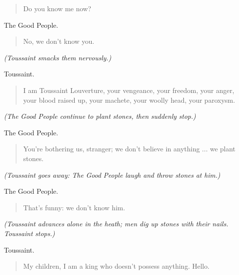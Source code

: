 \documentclass[letterpaper,article,12pt,oneside,notitlepage]{memoir}
\begin{document}
\begin{verse}
Do you know me now? \\
\end{verse}

\begin{center}The Good People.\end{center}

\begin{verse}
No, we don't know you. \\
\end{verse}

\textit{(Toussaint smacks them nervously.)}

\begin{center}Toussaint.\end{center}

\begin{verse}
I am Toussaint Louverture, your vengeance, your freedom, your anger, your blood raised up, your machete, your woolly head, your paroxysm. \\
\end{verse}

\textit{(The Good People continue to plant stones, then suddenly stop.)}

\begin{center}The Good People.\end{center}

\begin{verse}
You're bothering us, stranger; we don't believe in anything ... we plant stones. \\
\end{verse}

\textit{(Toussaint goes away: The Good People laugh and throw stones at him.)}

\begin{center}The Good People.\end{center}

\begin{verse}
That's funny: we don't know him. \\
\end{verse}

\textit{(Toussaint advances alone in the heath; men dig up stones with their nails. Toussaint stops.)}

\begin{center}Toussaint.\end{center}

\begin{verse}
My children, I am a king who doesn't possess anything. Hello. \\
\end{verse}
\end{document}
